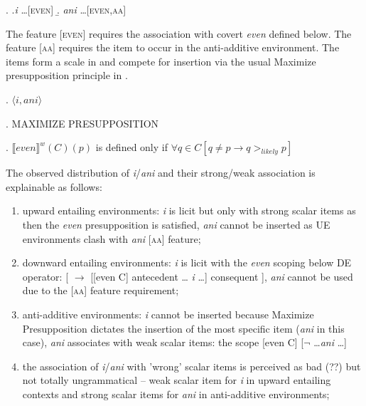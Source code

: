 \documentclass[12pt]{scrartcl}
\begin{document}
\ex. \a.\textit{i} \ldots [\textsc{even}]
\b. \textit{ani} \ldots [\textsc{even},\textsc{aa}]

The feature [\textsc{even}] requires the association with covert \textit{even} defined below. The feature [\textsc{aa}] requires the item to occur in the anti-additive environment. The items form a scale in \Next and compete for insertion via the usual Maximize presupposition principle in \NNext.

\ex. $\langle i,ani\rangle$

\ex. MAXIMIZE PRESUPPOSITION

\ex. \(\llbracket even\rrbracket ^w (C)(p)\) is defined only if
\(\forall q \in C[q \neq p \rightarrow q >_{likely} p]\)

The observed distribution of \textit{i}/\textit{ani} and their strong/weak association is explainable as follows:

\begin{enumerate}
	\item upward entailing environments: \textit{i} is licit but only with strong scalar items as then the \textit{even} presupposition is satisfied, \textit{ani} cannot be inserted as UE environments clash with \textit{ani} [\textsc{aa}] feature;
	\item downward entailing environments: \textit{i} is licit with the \textit{even} scoping below DE operator:  {[} \(\rightarrow\) {[}{[}even C{]} antecedent \ldots{} \textit{i} \ldots ] consequent ], \textit{ani} cannot be used due to the [\textsc{aa}] feature requirement;
	\item anti-additive environments: \textit{i} cannot be inserted because Maximize Presupposition dictates the insertion of the most specific item (\textit{ani} in this case), \textit{ani} associates with weak scalar items: the scope [even C] [$\neg$ \ldots \textit{ani} \ldots]
	\item the association of \textit{i}/\textit{ani} with 'wrong' scalar items is perceived as bad (??) but not totally ungrammatical -- weak scalar item for \textit{i} in upward entailing contexts and strong scalar items for \textit{ani} in anti-additive environments;
	
\end{enumerate}
\end{document}
